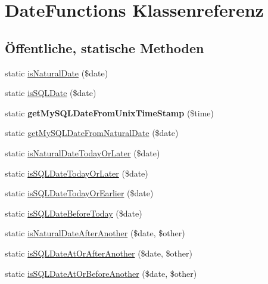 \hypertarget{class_date_functions}{}\section{Date\+Functions Klassenreferenz}
\label{class_date_functions}
\subsection*{Öffentliche, statische Methoden}
\begin{DoxyCompactItemize}
\item 
static \mbox{\hyperlink{class_date_functions_afc5d5564d68170a71949997fe3458da5}{is\+Natural\+Date}} (\$date)
\item 
static \mbox{\hyperlink{class_date_functions_af2c2921c0dcb0a53b25acafb62ee1e7a}{is\+S\+Q\+L\+Date}} (\$date)
\item 
\mbox{\label{class_date_functions_adc8d7d3661c31cfb427adf16cbc0c26a}} 
static {\bfseries get\+My\+S\+Q\+L\+Date\+From\+Unix\+Time\+Stamp} (\$time)
\item 
static \mbox{\hyperlink{class_date_functions_a597f79b0ea436edd80f20520929f2026}{get\+My\+S\+Q\+L\+Date\+From\+Natural\+Date}} (\$date)
\item 
static \mbox{\hyperlink{class_date_functions_a5e7fbcb6673791126b6ac56536311537}{is\+Natural\+Date\+Today\+Or\+Later}} (\$date)
\item 
static \mbox{\hyperlink{class_date_functions_ad87c02034e1932f94ebe93f93cf9791d}{is\+S\+Q\+L\+Date\+Today\+Or\+Later}} (\$date)
\item 
static \mbox{\hyperlink{class_date_functions_a931e567e820f98ea4dea5763e4480e98}{is\+S\+Q\+L\+Date\+Today\+Or\+Earlier}} (\$date)
\item 
static \mbox{\hyperlink{class_date_functions_a14da92d54bdbeae157ae5ec43df2df5a}{is\+S\+Q\+L\+Date\+Before\+Today}} (\$date)
\item 
static \mbox{\hyperlink{class_date_functions_a16e39ab1e86381379e3d99b7493bb8f1}{is\+Natural\+Date\+After\+Another}} (\$date, \$other)
\item 
static \mbox{\hyperlink{class_date_functions_aabb363330f429af11853ac89cf98507b}{is\+S\+Q\+L\+Date\+At\+Or\+After\+Another}} (\$date, \$other)
\item 
static \mbox{\hyperlink{class_date_functions_a1beb9cf5f7b803048831b6b23aeb0749}{is\+S\+Q\+L\+Date\+At\+Or\+Before\+Another}} (\$date, \$other)
\item 

\end{DoxyCompactItemize}
